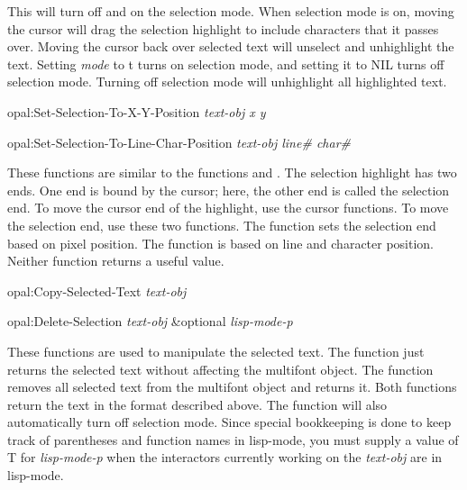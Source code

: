 This will turn off and on the selection mode.  When selection mode is on,
moving the cursor will drag the selection highlight to include characters
that it passes over.  Moving the cursor back over selected text will unselect
and unhighlight the text.  Setting {\it mode} to {\sc t} turns on
selection mode, and setting it to {\sc NIL} turns off selection mode.
Turning off selection mode will unhighlight all highlighted text.

\begin{programexample}
opal:Set-Selection-To-X-Y-Position {\it text-obj  x y}\value{function}

opal:Set-Selection-To-Line-Char-Position {\it text-obj  line\# char\#}\value{function}
\end{programexample}

These functions are similar to the functions 
and .  The selection highlight has two
ends.  One end is bound by the cursor; here, the other end is called the
selection end.  To move the cursor end of the highlight, use the cursor
functions.  To move the selection end, use these two functions.  The function
 sets the selection end based on pixel
position.  The function  is based on
line and character position.  Neither function returns a useful value.

\begin{programexample}
opal:Copy-Selected-Text {\it text-obj}\value{function}

opal:Delete-Selection {\it text-obj} \&optional {\it lisp-mode-p} \value{function}
\end{programexample}

These functions are used to manipulate the selected text.  The
 function just returns the selected text without affecting
the multifont object.  The function  removes all selected
text from the multifont object and returns it.  Both functions return the text
in the  format described above.  The function 
will also automatically turn off selection mode.  Since special bookkeeping
is done to keep track of parentheses and function names in lisp-mode, you must
supply a value of T for {\it lisp-mode-p} when the interactors currently working
on the {\it text-obj} are in lisp-mode.

